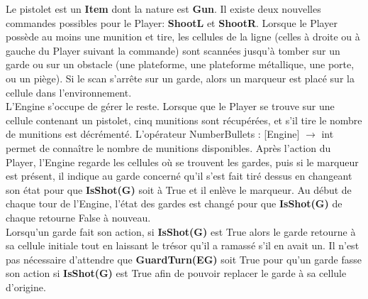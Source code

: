 \documentclass{article}
\begin{document}
Le pistolet est un \textbf{Item} dont la nature est \textbf{Gun}. Il existe deux nouvelles commandes possibles pour le Player: \textbf{ShootL} et \textbf{ShootR}. Lorsque le Player possède au moins une munition et tire, les cellules de la ligne (celles à droite ou à gauche du Player suivant la commande) sont scannées jusqu'à tomber sur un garde ou sur un obstacle (une plateforme, une plateforme métallique, une porte, ou un piège). Si le scan s'arrête  sur un garde, alors un marqueur est placé sur la cellule dans l'environnement.\\

L'Engine s'occupe de gérer le reste. Lorsque que le Player se trouve sur une cellule contenant un pistolet, cinq munitions sont récupérées, et s'il tire le nombre de munitions est décrémenté. L'opérateur \textrm{NumberBullets : [Engine] $\rightarrow$ int} permet de connaître le nombre de munitions disponibles. Après l'action du Player, l'Engine regarde les cellules où se trouvent les gardes, puis si le marqueur est présent, il indique au garde concerné qu'il s'est fait tiré dessus en changeant son état pour que \textbf{IsShot(G)} soit à True et il enlève le marqueur. Au début de chaque tour de l'Engine, l'état des gardes est changé pour que \textbf{IsShot(G)} de chaque retourne False à nouveau.\\

Lorsqu'un garde fait son action, si \textbf{IsShot(G)} est True alors le garde retourne à sa cellule initiale tout en laissant le trésor qu'il a ramassé s'il en avait un. Il n'est pas nécessaire d'attendre que \textbf{GuardTurn(EG)} soit True pour qu'un garde fasse son action si \textbf{IsShot(G)} est True afin de pouvoir replacer le garde à sa cellule d'origine.
\end{document}

